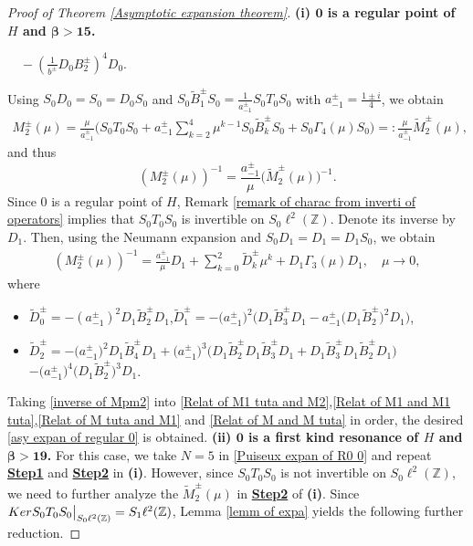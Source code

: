\documentclass[10pt,a4paper]{amsart}
\newcommand\Z{\mathbb{Z}}
\numberwithin{equation}{section}
\begin{document}
\begin{proof}[Proof of Theorem {\rm\ref{Asymptotic expansion theorem}}]{\bf{(i) ${\bm{0}}$ is a regular point of $H$ and {$\bm{\beta>15}$}.}}
\begin{itemize}
$\quad-\left(\frac{1}{b^{\pm}}D_0B^{\pm}_2\right)^4D_0$.
\end{itemize}
Using $S_0D_0=S_0=D_0S_0$ and $S_0\widetilde{B}_{1}^{\pm}S_0=\frac{1}{a^{\pm}_{-1}}S_0T_0S_0$ with $a^{\pm}_{-1}=\frac{1\pm i}{4}$, we obtain
\begin{align*}
M^{\pm}_2(\mu)=\frac{\mu}{a^{\pm}_{-1}}\Big(S_0T_0S_0+a^{\pm}_{-1}\sum\limits_{k=2}^{4}\mu^{k-1}S_0\widetilde{B}_{k}^{\pm}S_0+S_0\Gamma_4(\mu)S_0\Big)=:\frac{\mu}{a^{\pm}_{-1}}\widetilde{M}^{\pm}_2(\mu),
\end{align*}
and thus
\begin{equation}\label{Relat of M2 and M2 tuta}
\left(M^{\pm}_2(\mu)\right)^{-1}=\frac{a^{\pm}_{-1}}{\mu}\big(\widetilde{M}_{2}^{\pm}(\mu)\big)^{-1}.
\end{equation}
Since $0$ is a regular point of $H$, Remark \ref{remark of charac from inverti of operators} implies that $S_0T_0S_0$ is invertible on $S_0\ell^2(\Z)$. Denote its inverse by $D_1$. Then, using the Neumann expansion and $S_0D_1=D_1=D_1S_0$, we obtain
\begin{align}\label{inverse of Mpm2}
\left(M^{\pm}_2(\mu)\right)^{-1}=\frac{a^{\pm}_{-1}}{\mu}D_1+\sum\limits_{k=0}^{2}\widetilde{D}^{\pm}_k\mu^k+D_1\Gamma_3(\mu)D_1,\quad\mu\rightarrow0,
\end{align}
where
\begin{itemize}
\item
$\widetilde{D}^{\pm}_0=-\left(a^{\pm}_{-1}\right)^2D_1\widetilde{B}_{2}^{\pm}D_1$,\quad $\widetilde{D}^{\pm}_{1}=-\big(a^{\pm}_{-1}\big)^2\big(D_1\widetilde{B}_{3}^{\pm}D_1-a^{\pm}_{-1}\big(D_1\widetilde{B}_{2}^{\pm}\big)^2D_1\big)$,
\vskip0.2cm
\item $\widetilde{D}^{\pm}_2=-\big(a^{\pm}_{-1}\big)^2D_1\widetilde{B}_{4}^{\pm}D_1+\big(a^{\pm}_{-1}\big)^3\big(D_1\widetilde{B}_{2}^{\pm}D_1\widetilde{B}_{3}^{\pm}D_1+D_1\widetilde{B}_{3}^{\pm}D_1\widetilde{B}_{2}^{\pm}D_1\big)$
    $-\big(a^{\pm}_{-1}\big)^4\big(D_1\widetilde{B}_{2}^{\pm}\big)^3D_1$.
\end{itemize}
Taking \eqref{inverse of Mpm2} into \eqref{Relat of M1 tuta and M2},\eqref{Relat of M1 and M1 tuta},\eqref{Relat of M tuta and M1} and \eqref{Relat of M and M tuta} in order, the desired \eqref{asy expan of regular 0} is obtained.
\vskip0.2cm
{\bf{(ii) ${\bm{0}}$ is a first kind resonance of $H$ and {$\bm{\beta>19}$}.}} For this case, we take $N=5$ in \eqref{Puiseux expan of R0 0} and repeat {\bf{\underline{Step1}}} and  {\bf{\underline{Step2}}} in {\bf{(i)}}. However, since $S_0T_0S_0$ is not invertible on $S_0\ell^2(\Z)$, we need to further analyze the $\widetilde{M}^{\pm}_2(\mu)$ in {\bf{\underline{Step2}}} of {\bf{(i)}}. Since ${\rm Ker}S_0T_0S_0\big|_{S_0\ell^2(\Z)}=S_1\ell^2(\Z)$, Lemma \ref{lemm of expa} yields the following further reduction.

\end{proof}
\end{document}
